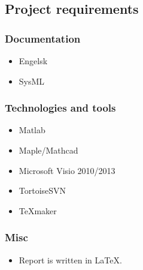 \subsection{Project requirements}

\subsubsection{Documentation}
\begin{itemize}
\item Engelsk
\item SysML
\end{itemize}

\subsubsection{Technologies and tools}
\begin{itemize}
\item Matlab
\item Maple/Mathcad
\item Microsoft Visio 2010/2013
\item TortoiseSVN
\item TeXmaker
\end{itemize}

\subsubsection{Misc}
\begin{itemize}
\item Report is written in LaTeX.
\end{itemize}

